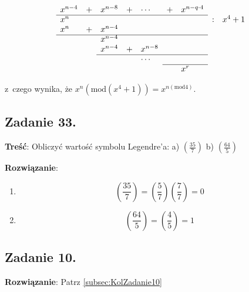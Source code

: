 \documentclass[a4paper,10pt, twocolumn]{article}
\begin{document}
\begin{equation*}
	\begin{array}{lllllllll} 
		x^{n-4} & + & x^{n-8} & + & \cdots & + & x^{n-q \cdot 4} & & \\
		\cline{1-7}
		x^{n} & & & & & & & : & x^{4} + 1 \\
		x^{n} & + & x^{n-4} & & & & & & \\
		\cline{1-7}
		& & x^{n-4} & & & & & & \\
		& & x^{n-4} & + & x^{n-8} & & & & \\
		\cline{3-7}
		& & & & \cdots & & & & \\
		\cline{6-7}
		& & & & & & x^{r} & & \\
	\end{array}
\end{equation*}

\noindent z~czego wynika, że $x^{n} (\text{mod}(x^{4} + 1 )) = x^{n(\text{mod}4)}$.

\subsection{Zadanie 33.}
\textbf{Treść}: Obliczyć wartość symbolu Legendre'a: a) $(\frac{35}{7})$ b) $(\frac{64}{5})$

\textbf{Rozwiązanie}:
\begin{enumerate}
	\item{
		\begin{equation*}
			(\frac{35}{7})=(\frac{5}{7})(\frac{7}{7})=0
		\end{equation*}
	}
	\item{
		\begin{equation*}
			(\frac{64}{5})=(\frac{4}{5})=1
		\end{equation*}
	}
\end{enumerate}

\subsection{Zadanie 10.}
\textbf{Rozwiązanie}: Patrz \ref{subsec:KolZadanie10}
\end{document}
